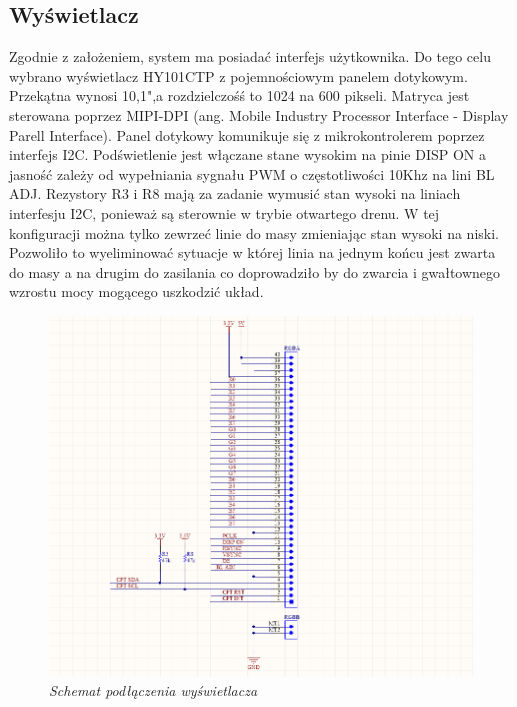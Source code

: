 \documentclass[eng,printmode]{mgr}
\begin{document}
\subsection*{Wyświetlacz}
Zgodnie z założeniem, system ma posiadać interfejs  użytkownika. Do tego celu wybrano wyświetlacz HY101CTP z pojemnościowym panelem dotykowym. Przekątna wynosi 10,1",a rozdzielczośś to 1024 na 600 pikseli. Matryca jest sterowana poprzez MIPI-DPI (ang. Mobile Industry Processor Interface - Display Parell Interface). Panel dotykowy komunikuje się z mikrokontrolerem poprzez interfejs I2C. Podświetlenie jest włączane stane wysokim na pinie DISP ON a jasność zależy od wypełniania sygnału PWM o częstotliwości 10Khz na lini BL ADJ.
Rezystory R3 i R8 mają za zadanie wymusić stan wysoki na liniach interfesju I2C, ponieważ są sterownie w trybie otwartego drenu. W tej konfiguracji można tylko zewrzeć linie do masy zmieniając stan wysoki na niski. Pozwoliło to wyeliminować sytuacje w której linia na jednym końcu jest zwarta do masy a na drugim do zasilania co doprowadziło by do zwarcia i gwałtownego wzrostu mocy mogącego uszkodzić układ.
\begin{figure}[!h]
    \centering
    \includegraphics[width=\textwidth]{schematics/display.png}
    \caption{\textit{ Schemat podłączenia wyświetlacza}}
\end{figure}
\end{document}
